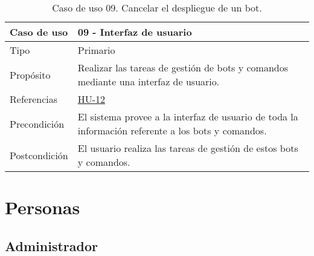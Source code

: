 \begin{table}[H]
    \centering
    \def\arraystretch{1.25}
    \begin{adjustbox}{max width=\textwidth}
    \begin{tabularx}{\textwidth}{|l|L|}
    \hline
        \textbf{Caso de uso} & \textbf{09 - Interfaz de usuario} \\ \hline
    \hline
        Tipo & Primario \\ \hline
        Propósito & Realizar las tareas de gestión de bots y comandos mediante una interfaz de usuario. \\ \hline
        Referencias & \hyperref[sec:hu12]{HU-12} \\ \hline
        Precondición & El sistema provee a la interfaz de usuario de toda la información referente a los bots y comandos. \\ \hline
        Postcondición & El usuario realiza las tareas de gestión de estos bots y comandos. \\ \hline
    \end{tabularx}
    \end{adjustbox}
    \caption{Caso de uso 09. Cancelar el despliegue de un bot.}
\end{table}


\section{Personas}

\subsection{Administrador}
\label{sec:personaAdmin}

